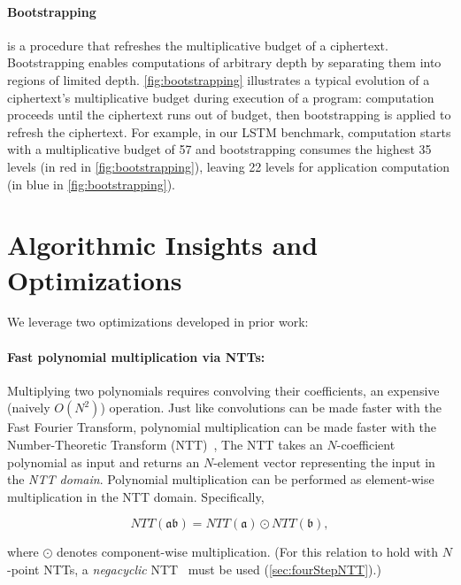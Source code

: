\figBootstrapping

\paragraph{Bootstrapping} is a procedure that refreshes the multiplicative
budget of a ciphertext. Bootstrapping enables computations of arbitrary depth
by separating them into regions of limited depth. \autoref{fig:bootstrapping}
illustrates a typical evolution of a ciphertext's multiplicative budget during
execution of a program: computation proceeds until the ciphertext runs out of
budget, then bootstrapping is applied to refresh the ciphertext. For example,
in our LSTM benchmark, computation starts with a multiplicative budget of 57
and bootstrapping consumes the highest 35 levels (in red in
\autoref{fig:bootstrapping}), leaving 22 levels for application computation (in
blue in \autoref{fig:bootstrapping}).

\section{Algorithmic Insights and Optimizations}\label{sec:algoInsights}
\label{sec:fhe_optimizations}

We leverage two optimizations developed in prior work:

\paragraph{Fast polynomial multiplication via NTTs:} Multiplying two
polynomials requires convolving their coefficients, an expensive (naively
$O(N^2)$) operation. Just like convolutions can be made faster with the Fast
Fourier Transform, polynomial multiplication can be made faster with the
Number-Theoretic Transform (NTT)~\cite{moenck1976practical}, The NTT takes an
$N$\hyp{}coefficient polynomial as input and returns an $N$\hyp{}element vector
representing the input in the \textit{NTT domain}. Polynomial multiplication
can be performed as element-wise multiplication in the NTT domain.
Specifically,

\begin{equation*}
    NTT(\mathfrak{a}\mathfrak{b}) = NTT(\mathfrak{a}) \odot NTT(\mathfrak{b}),
\end{equation*}

where $\odot$ denotes component-wise multiplication. (For this relation to hold
with $N$\hyp{}point NTTs, a \emph{negacyclic}
NTT~\cite{lyubashevsky:tact10:ideal} must be used (\autoref{sec:fourStepNTT}).)

